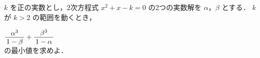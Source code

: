 ﻿\documentclass[../../../uem_mat_tok_q.tex]{subfiles}
\begin{document}
    $k$ を正の実数とし，2次方程式 $x^2+x-k=0$ の2つの実数解を $\alpha$，$\beta$ とする．%
    $k$ が $k>2$ の範囲を動くとき，

    \myspaceb%
    $\displaystyle%
        \myfraca{\alpha^3}{1-\beta}+\myfraca{\beta^3}{1-\alpha}%
    $\\
    の最小値を求めよ．
\end{document}
